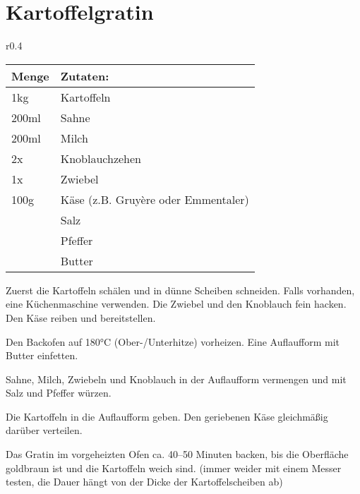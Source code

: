 \documentclass[../../book.tex]{subfiles}
\begin{document}
\section{Kartoffelgratin}
\begin{wraptable}{r}{0.4\textwidth}
  \centering
  \begin{tabularx}{0.39\textwidth}{|l|X|}
    \toprule
    Menge & Zutaten: \\
    \midrule
    1kg & Kartoffeln \\
    \midrule
    200ml & Sahne \\
    \midrule
    200ml & Milch \\
    \midrule
    2x & Knoblauchzehen \\
    \midrule
    1x & Zwiebel \\
    \midrule
    100g & Käse (z.B. Gruyère oder Emmentaler) \\
    \midrule
    & Salz \\
    \midrule
    & Pfeffer \\
    \midrule
    & Butter \\
    \bottomrule
  \end{tabularx}
\end{wraptable}

Zuerst die Kartoffeln schälen und in dünne Scheiben schneiden. Falls vorhanden, eine Küchenmaschine verwenden. Die Zwiebel und den Knoblauch fein hacken. Den Käse reiben und bereitstellen.

Den Backofen auf 180°C (Ober-/Unterhitze) vorheizen. Eine Auflaufform mit Butter einfetten.

Sahne, Milch, Zwiebeln und Knoblauch in der Auflaufform vermengen und mit Salz und Pfeffer würzen.

Die Kartoffeln in die Auflaufform geben. Den geriebenen Käse gleichmäßig darüber verteilen.

Das Gratin im vorgeheizten Ofen ca. 40–50 Minuten backen, bis die Oberfläche goldbraun ist und die Kartoffeln weich sind. (immer weider mit einem Messer testen, die Dauer hängt von der Dicke der Kartoffelscheiben ab)

\newpage
\end{document}
